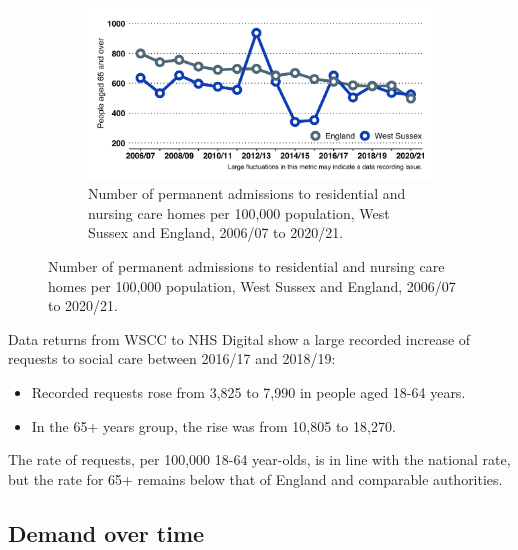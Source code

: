 \begin{figure}
\begin{subfigure}[b]{0.49\textwidth}
        \label{fig:sc:requests_65_plus}
    \end{subfigure}
    \begin{subfigure}[b]{0.55\textwidth}
        \centering
        \includegraphics[width=\textwidth]{images/perm_res_adm_time.png}
        \caption{Number of permanent admissions to residential and nursing care homes per 100,000 population, West Sussex and England, 2006/07 to 2020/21.}
        \label{fig:sc:residential_admissions}
    \end{subfigure}
\end{figure}




Data returns from WSCC to NHS Digital show a large recorded increase of requests to social care between 2016/17 and 2018/19:

\begin{itemize}[noitemsep]
    \item Recorded requests rose from 3,825 to 7,990 in people aged 18-64 years.
    \item In the 65+ years group, the rise was from 10,805 to 18,270.
\end{itemize}

The rate of requests, per 100,000 18-64 year-olds, is in line with the national rate, but the rate for 65+ remains below that of England and comparable authorities.

\subsection{Demand over time}
